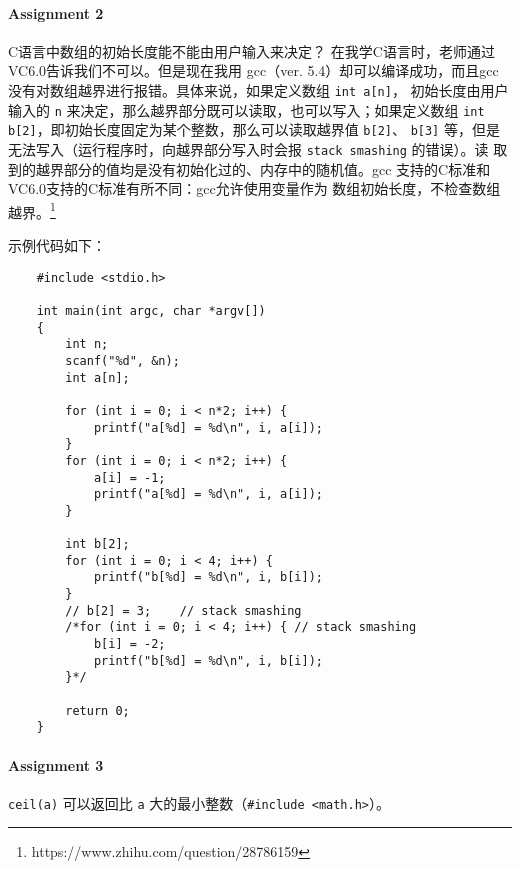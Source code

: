 \documentclass[UTF8]{ctexart}
\begin{document}
\paragraph{Assignment 2}
C语言中数组的初始长度能不能由用户输入来决定？ 在我学C语言时，老师通过VC6.0告诉我们不可以。但是现在我用
gcc（ver. 5.4）却可以编译成功，而且gcc没有对数组越界进行报错。具体来说，如果定义数组 \texttt{int a[n]}，
初始长度由用户输入的 \texttt{n} 来决定，那么越界部分既可以读取，也可以写入；如果定义数组
\texttt{int b[2]}，即初始长度固定为某个整数，那么可以读取越界值 \texttt{b[2]}、
\texttt{b[3]} 等，但是无法写入（运行程序时，向越界部分写入时会报 \texttt{stack smashing} 的错误）。读
取到的越界部分的值均是没有初始化过的、内存中的随机值。gcc 支持的C标准和VC6.0支持的C标准有所不同：gcc允许使用变量作为
数组初始长度，不检查数组越界。\footnote{https://www.zhihu.com/question/28786159}

示例代码如下：
\begin{verbatim}
    #include <stdio.h>

    int main(int argc, char *argv[])
    {
        int n;
        scanf("%d", &n);
        int a[n];

        for (int i = 0; i < n*2; i++) {
            printf("a[%d] = %d\n", i, a[i]);
        }
        for (int i = 0; i < n*2; i++) {
            a[i] = -1;
            printf("a[%d] = %d\n", i, a[i]);
        }

        int b[2];
        for (int i = 0; i < 4; i++) {
            printf("b[%d] = %d\n", i, b[i]);
        }
        // b[2] = 3;    // stack smashing
        /*for (int i = 0; i < 4; i++) { // stack smashing
            b[i] = -2;
            printf("b[%d] = %d\n", i, b[i]);
        }*/

        return 0;
    }
\end{verbatim}

\paragraph{Assignment 3}
\texttt{ceil(a)} 可以返回比 \texttt{a} 大的最小整数（\texttt{#include <math.h>}）。
\end{document}
